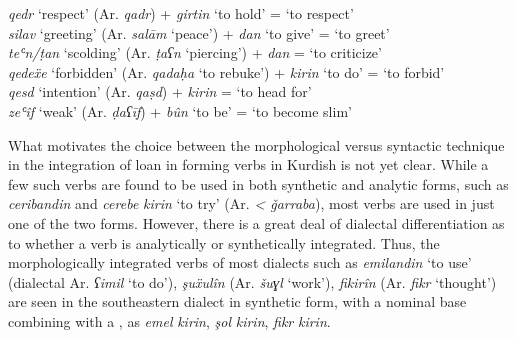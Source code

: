 \documentclass[output=paper]{langsci/langscibook}
\begin{document}
\ea\label{compound}
\textit{qedr} ‘respect’              (Ar. \textit{qadr})                +   \textit{girtin} ‘to hold’    =  ‘to respect’     \\
\textit{silav} ‘greeting’            (Ar. \textit{salām} ‘peace’)       +   \textit{dan} ‘to give’       =   ‘to greet’      \\
\textit{teʿn\slash ṭan} ‘scolding’   (Ar. \textit{ṭaʕn} ‘piercing’)     + \textit{dan}                   =   ‘to criticize’  \\
\textit{qedeẍe} ‘forbidden’          (Ar. \textit{qadaḥa} ‘to rebuke’)  +   \textit{kirin} ‘to do’       =   ‘to forbid’     \\
\textit{qesd} ‘intention’            (Ar. \textit{qaṣd})                +   \textit{kirin}               =   ‘to head for’   \\
\textit{zeʿîf} ‘weak’                (Ar. \textit{ḍaʕīf})               +   \textit{bûn} ‘to be’         =   ‘to become slim’
\z

What motivates the choice between the morphological versus syntactic technique in the integration of  loan  in forming verbs in Kurdish is not yet clear. While a few such verbs are found to be used in both synthetic and analytic forms, such as \textit{ceribandin} and \textit{cerebe} \textit{kirin} ‘to try’ (Ar. \textit{< ǧarraba}), most verbs are used in just one of the two forms. However, there is a great deal of dialectal differentiation as to whether a verb is analytically or synthetically integrated. Thus, the morphologically integrated verbs of most   dialects such as \textit{emilandin} ‘to use’ (dialectal Ar. \textit{ʕimil} ‘to do’), \textit{şuẍulîn} (Ar. \textit{šuɣl} ‘work’), \textit{fikirîn} (Ar. \textit{fikr} ‘thought’) are seen in the southeastern  dialect in synthetic form, with a nominal base combining with a , as \textit{emel} \textit{kirin}, \textit{şol} \textit{kirin}, \textit{fikr} \textit{kirin}.   
\end{document}
